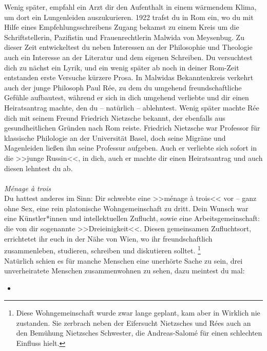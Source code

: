 \documentclass[12pt, a4paper, openany]{report}
\begin{document}
Wenig später, empfahl ein Arzt dir den Aufenthalt in einem wärmendem Klima, um dort ein Lungenleiden auszukurieren. 
1922 trafst du in Rom ein, wo du mit Hilfe eines Empfehlungsschreibens Zugang bekamst zu einem Kreis um die Schriftstellerin, Pazifistin und Frauenrechtlerin Malwida von Meysenbug.
Zu dieser Zeit entwickeltest du neben Interessen an der Philosophie und Theologie auch ein Interesse an der Literatur und dem eigenen Schreiben. 
Du versuchtest dich zu nächst ein Lyrik, und ein wenig später ab noch in deiner Rom-Zeit entstanden erste Versuche kürzere Prosa. 
In Malwidas Bekanntenkreis verkehrt auch der junge Philosoph Paul Rée, zu dem du umgehend freundschaftliche Gefühle aufbautest, während er sich in dich umgehend verliebte und dir einen Heiratsantrag machte, den du -- natürlich -- ablehntest. 
Wenig später machte Rée dich mit seinem Freund Friedrich Nietzsche bekannt, der ebenfalls aus gesundheitlichen Gründen nach Rom reiste. 
Friedrich Nietzsche war Professor für klassische Philologie an der Universität Basel, doch seine Migräne und Magenleiden ließen ihn seine Professur aufgeben. 
Auch er verliebte sich sofort in die >>junge Russin<<, in dich, auch er machte dir einen Heiratsantrag und auch diesen lehntest du ab.
\\
\\
\textit{Ménage à trois}\\
Du hattest anderes im Sinn: 
Dir schwebte eine >>ménage à trois<< vor -- ganz ohne Sex, eine rein platonische Wohngemeinschaft zu dritt.
Dein Wunsch war eine Künstler*innen und intellektuellen Zuflucht, sowie eine Arbeitsgemeinschaft: die von dir sogenannte >>Dreieinigkeit<<.
Diesen gemeinsamen Zufluchtsort, errichtetet ihr euch in der Nähe von Wien, wo ihr freundschaftlich zusammenleben, studieren, schreiben und diskutieren solltet.%
\footnote{
  Diese Wohngemeinschaft wurde zwar lange geplant, kam aber in Wirklich nie zustanden. 
  Sie zerbrach neben der Eifersucht Nietzsches und Rées auch an den Bemühung Nietzsches Schwester, die Andreas-Salomé für einen schlechten Einfluss hielt.
}\\
Natürlich schien es für manche Menschen eine unerhörte Sache zu sein, drei unverheiratete Menschen zusammenwohnen zu sehen, dazu meintest du mal:
\begin{itemize}
  \item[] \emph{}
\end{itemize}
\end{document}
